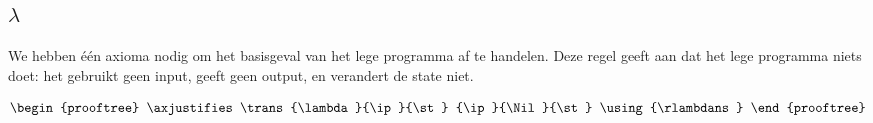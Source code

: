 \subsection{$\lambda$}
\label{sec:rules:lambda}

We hebben één axioma nodig om het basisgeval van het lege programma af te
handelen. Deze regel geeft aan dat het lege programma niets doet: het gebruikt
geen input, geeft geen output, en verandert de state niet.

$$
\begin{prooftree}
	\axjustifies
	\trans
		{\lambda}{\ip}{\st}
		{\ip}{\Nil}{\st}
	\using{\rlambdans}
\end{prooftree}
$$

